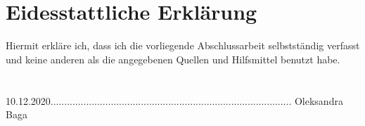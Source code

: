 \chapter*{Eidesstattliche Erklärung}
Hiermit erkläre ich, dass ich die vorliegende Abschlussarbeit selbstständig verfasst und keine
anderen als die angegebenen Quellen und Hilfsmittel benutzt habe.\\\\\\

10.12.2020........................................................................................ Oleksandra Baga






